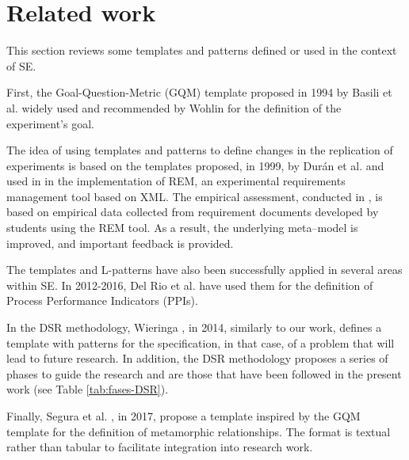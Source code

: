 
\section{Related work}
\label{sec:trabajos}

This section reviews some templates and patterns defined or used in the context of SE.

First, the Goal-Question-Metric (GQM) template proposed in 1994 by Basili et al. \cite{Basili1994} widely used and recommended by Wohlin \cite{wohlin:experimentation} for the definition of the experiment's goal. 

The idea of using templates and patterns to define changes in the replication of experiments is based on the templates proposed, in 1999, by Durán et al. \cite{duran1999requirements} and used in \cite{duran2002supporting} in the implementation of REM, an experimental requirements management tool based on XML. 
The empirical assessment, conducted in \cite{bernardez2004controlled}, is based on empirical data collected from requirement documents developed by students using the REM tool. As a result, the underlying meta--model is improved, and important feedback is provided.

The templates and L-patterns have also been successfully applied in several areas within SE. In 2012-2016, Del Rio et al. \cite{del2012defining,del2016using} have used them for the definition of Process Performance Indicators (PPIs).

In the DSR methodology, Wieringa  \cite{38631e0608b54d4299d5707f3a78debf}, in 2014, similarly to our work, defines a template with patterns for the specification, in that case, of a problem that will lead to future research. In addition, the DSR methodology proposes a series of phases to guide the research and are those that have been followed in the present work (see Table \ref{tab:fases-DSR}).

Finally, Segura et al.  \cite{segura2017template}, in 2017, propose a template inspired by the GQM template for the definition of metamorphic relationships. The format is textual rather than tabular to facilitate integration into research work.
